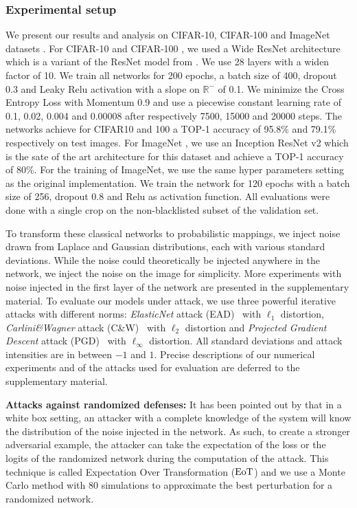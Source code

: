 \subsubsection{Experimental setup}
We present our results and analysis on  CIFAR-10, CIFAR-100 \citep{krizhevsky2009learning} and ImageNet datasets \citep{imagenet_cvpr09}. For CIFAR-10 and CIFAR-100 \citep{krizhevsky2009learning}, we used a Wide ResNet architecture \citep{ZagoruykoK16} which is a variant of the ResNet model from \citep{He_2016_CVPR}. We use 28 layers with a widen factor of 10. We train all networks for 200 epochs, a batch size of 400, dropout 0.3 and Leaky Relu activation with a slope on $\mathbb{R}^-$ of 0.1. We minimize the Cross Entropy Loss with Momentum 0.9 and use a piecewise constant learning rate of 0.1, 0.02, 0.004 and 0.00008 after respectively 7500, 15000 and 20000 steps. The networks achieve for CIFAR10 and 100 a TOP-1 accuracy of 95.8\% and 79.1\% respectively on test images. For ImageNet \citep{imagenet_cvpr09}, we use an Inception ResNet v2 \citep{szegedy2017inception} which is the sate of the art architecture for this dataset and achieve a TOP-1 accuracy of 80\%. For the training of ImageNet, we use the same hyper parameters setting as the original implementation. We train the network for 120 epochs with a batch size of 256, dropout 0.8 and Relu as activation function. All evaluations were done with a single crop on the non-blacklisted subset of the validation set.

To transform these classical networks to probabilistic mappings, we inject noise drawn from Laplace and Gaussian distributions, each with various standard deviations. While the noise could theoretically be injected anywhere in the network, we inject the noise on the image for simplicity. More experiments with noise injected in the first layer of the network are presented in the supplementary material. To evaluate our models under attack, we use three powerful iterative attacks with different norms: \emph{ElasticNet} attack (EAD)~\citep{chen2018ead} with $\ell_1$ distortion, \emph{Carlini\&Wagner} attack (C\&W)~\citep{carlini2017towards} with $\ell_2$ distortion and \emph{Projected Gradient Descent} attack (PGD)~\citep{madry2017towards} with $\ell_\infty$ distortion. All standard deviations and attack intensities are in between $-1$ and $1$. Precise descriptions of our numerical experiments and of the attacks used for evaluation are deferred to the supplementary material. 

\textbf{Attacks against randomized defenses:} It has been pointed out by \citep{athalye2017synthesizing,carlini2019evaluating} that in a white box setting, an attacker with a complete knowledge of the system will know the distribution of the noise injected in the network. As such, to create a stronger adversarial example, the attacker can take the expectation of the loss or the logits of the randomized network during the computation of the attack. This technique is called Expectation Over Transformation ($\text{EoT}$) and we use a Monte Carlo method with $80$ simulations to approximate the best perturbation for a randomized network. 

